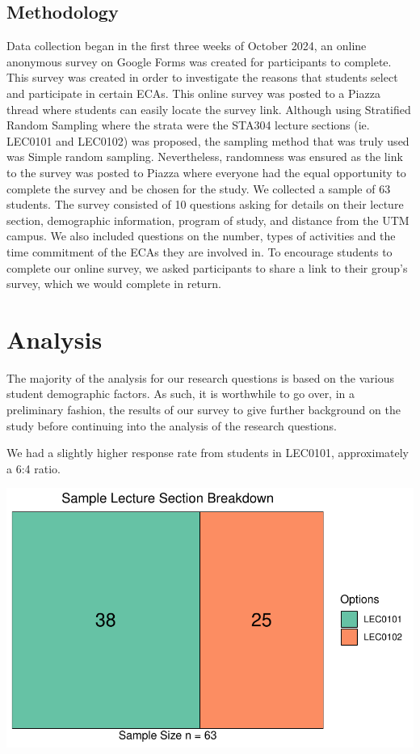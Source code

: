 \documentclass[
  letterpaper,
  DIV=11,
  numbers=noendperiod]{scrartcl}
\begin{document}
\subsection{Methodology}\label{methodology}

Data collection began in the first three weeks of October 2024, an
online anonymous survey on Google Forms was created for participants to
complete. This survey was created in order to investigate the reasons
that students select and participate in certain ECAs. This online survey
was posted to a Piazza thread where students can easily locate the
survey link. Although using Stratified Random Sampling where the strata
were the STA304 lecture sections (ie. LEC0101 and LEC0102) was proposed,
the sampling method that was truly used was Simple random sampling.
Nevertheless, randomness was ensured as the link to the survey was
posted to Piazza where everyone had the equal opportunity to complete
the survey and be chosen for the study. We collected a sample of 63
students. The survey consisted of 10 questions asking for details on
their lecture section, demographic information, program of study, and
distance from the UTM campus. We also included questions on the number,
types of activities and the time commitment of the ECAs they are
involved in. To encourage students to complete our online survey, we
asked participants to share a link to their group's survey, which we
would complete in return.

\section{Analysis}\label{sec-data1}

The majority of the analysis for our research questions is based on the
various student demographic factors. As such, it is worthwhile to go
over, in a preliminary fashion, the results of our survey to give
further background on the study before continuing into the analysis of
the research questions.

We had a slightly higher response rate from students in LEC0101,
approximately a 6:4 ratio.

\includegraphics{technical_report_files/figure-pdf/p1-1.pdf}
\end{document}
